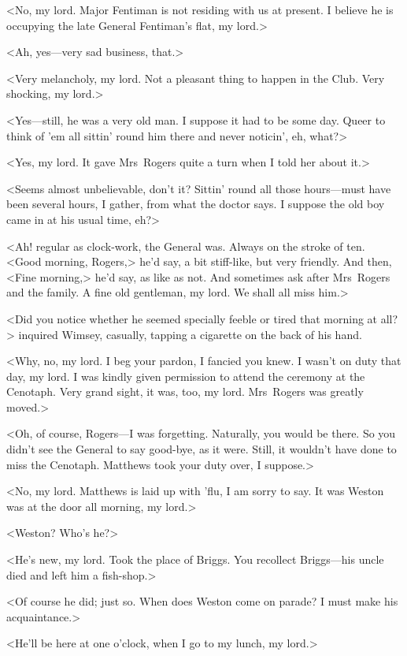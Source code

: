 <No, my lord. Major Fentiman is not residing with us at present. I believe he is occupying the late General Fentiman's flat, my lord.>

<Ah, yes—very sad business, that.>

<Very melancholy, my lord. Not a pleasant thing to happen in the Club. Very shocking, my lord.>

<Yes—still, he was a very old man. I suppose it had to be some day. Queer to think of 'em all sittin' round him there and never noticin', eh, what?>

<Yes, my lord. It gave Mrs~Rogers quite a turn when I told her about it.>

<Seems almost unbelievable, don't it? Sittin' round all those hours—must have been several hours, I gather, from what the doctor says. I suppose the old boy came in at his usual time, eh?>

<Ah! regular as clock-work, the General was. Always on the stroke of ten. <Good morning, Rogers,> he'd say, a bit stiff-like, but very friendly. And then, <Fine morning,> he'd say, as like as not. And sometimes ask after Mrs~Rogers and the family. A fine old gentleman, my lord. We shall all miss him.>

<Did you notice whether he seemed specially feeble or tired that morning at all?> inquired Wimsey, casually, tapping a cigarette on the back of his hand.

<Why, no, my lord. I beg your pardon, I fancied you knew. I wasn't on duty that day, my lord. I was kindly given permission to attend the ceremony at the Cenotaph. Very grand sight, it was, too, my lord. Mrs~Rogers was greatly moved.>

<Oh, of course, Rogers—I was forgetting. Naturally, you would be there. So you didn't see the General to say good-bye, as it were. Still, it wouldn't have done to miss the Cenotaph. Matthews took your duty over, I suppose.>

<No, my lord. Matthews is laid up with 'flu, I am sorry to say. It was Weston was at the door all morning, my lord.>

<Weston? Who's he?>

<He's new, my lord. Took the place of Briggs. You recollect Briggs—his uncle died and left him a fish-shop.>

<Of course he did; just so. When does Weston come on parade? I must make his acquaintance.>

<He'll be here at one o'clock, when I go to my lunch, my lord.>

